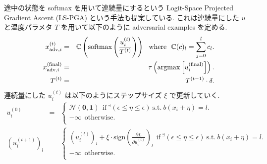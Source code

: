 途中の状態を softmax を用いて連続量にするという Logit-Space Projected Gradient Ascent (LS-PGA) という手法も提案している.
これは連続量にした $u$ と温度パラメタ $T$ を用いて以下のように adversarial examples を定める.
%
\begin{eqnarray}
x^{(t)}_{\text{adv},i} &=& \mathbb{C} \left( \text{softmax} \left( \frac{u^{(t)}_i}{T^{(t)}} \right) \right) \ \ \text{where} \ \ \mathbb{C}(c)_l = \sum_{j = 0}^l c_l. \\
x^{(\text{final})}_{\text{adv},i} &=& \tau \left( \argmax \left[ u^{(\text{final})}_i \right] \right).\\
T^{(t)} &=& T^{(t - 1)} \cdot \delta.
\label{eq:thermometer-encoding-lspga}
\end{eqnarray}
%
連続量にした $u^{(t)}_i$ は以下のようにステップサイズ $\xi$ で更新していく.
%
\begin{eqnarray}
u^{(0)}_i &=& \left\{ \begin{array}{l}
\mathcal{N} (\mathbf{0}, \mathbf{1}) \ \ \text{if} \ ^{\exists}(\epsilon \leq \eta \leq \epsilon) \ \text{s.t.} \ b(x_i + \eta) = l. \\
- \infty \ \ \text{otherwise.} \\
\end{array} \right.\\
(u^{(t + 1)}_i)_l &=& \left\{ \begin{array}{l}
(u^{(t)}_i)_l + \xi \cdot \text{sign} \left( \frac{\partial L}{\partial u^{(t)}_i} \right)_l \ \ \text{if} \ ^{\exists}(\epsilon \leq \eta \leq \epsilon) \ \text{s.t.} \ b(x_i + \eta) = l. \\
- \infty \ \ \text{otherwise.} \\
\end{array} \right.
\label{eq:thermometer-encoding-logit}
\end{eqnarray}
%

